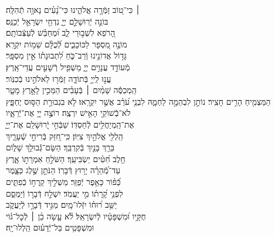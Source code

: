 \documentclass[twoside, openany, parskip=half, 11pt]{book}
\begin{document}
\begin{narrow}
 ׀ \hfill \break
כִּי־ט֭וֹב זַמְּֿרָ֣ה אֱלֹהֵ֑ינוּ \hfill כִּי־נָ֝עִ֗ים נָאוָ֥ה תְֿהִלָּֽה׃\\
בּוֹנֵ֣ה יְֿרֽוּשָׁלַ֣‍ִם יְיָ֑ \hfill נִדְחֵ֖י יִשְׂרָאֵ֣ל יְֿכַנֵּֽס׃\\
הָ֭רֹפֵא לִשְׁב֣וּרֵי לֵ֑ב \hfill וּ֝מְחַבֵּ֗שׁ לְֿעַצְּֿבוֹתָֽם׃\\
מוֹנֶ֣ה מִ֭סְפָּר לַכּוֹכָבִ֑ים \hfill לְֿ֝כֻלָּ֗ם שֵׁמ֥וֹת יִקְרָֽא׃\\
גָּד֣וֹל אֲדוֹנֵ֣ינוּ וְֿרַב־כֹּ֑חַ \hfill לִ֝תְבוּנָת֗וֹ אֵ֣ין מִסְפָּֽר׃ \\
מְֿעוֹדֵ֣ד עֲנָוִ֣ים יְיָ֑ \hfill מַשְׁפִּ֖יל רְֿשָׁעִ֣ים עֲדֵי־אָֽרֶץ׃\\
עֱנ֣וּ לַֽייָ֣ בְּֿתוֹדָ֑ה \hfill זַמְּֿר֖וּ לֵאלֹהֵ֣ינוּ בְֿכִנּֽוֹר׃\\
הַֽמְכַסֶּ֬ה שָׁמַ֨יִם ׀ בְּֿעָבִ֗ים \hfill הַמֵּכִ֣ין לָאָ֣רֶץ מָטָ֑ר\\ הַמַּצְמִ֖יחַ הָרִ֣ים חָצִֽיר׃ \hfill
נוֹתֵ֣ן לִבְהֵמָ֣ה לַחְמָ֑הּ לִבְנֵ֥י עֹ֝רֵ֗ב אֲשֶׁ֣ר יִקְרָֽאוּ׃ \hfill
לֹ֤א בִגְבוּרַ֣ת הַסּ֣וּס יֶחְפָּ֑ץ \\ לֹא־בְֿֿשׁוֹקֵ֖י הָאִ֣ישׁ יִרְצֶֽה׃ \hfill
רוֹצֶ֣ה יְיָ֭ אֶת־יְֿרֵאָ֑יו\\ אֶת־הַֽמְיַחֲלִ֥ים לְֿחַסְדּֽוֹ׃ \hfill
שַׁבְּֿחִ֣י יְֿ֭רוּשָׁלַ‍ִם אֶת־יְיָ֑\\ הַֽלְלִ֖י אֱלֹהַ֣יִךְ צִיּֽוֹן׃ \hfill
כִּֽי־חִ֭זַּק בְּֿרִיחֵ֣י שְֿׁעָרָ֑יִךְ\\ בֵּרַ֖ךְ בָּנַ֣יִךְ בְּֿקִרְבֵּֽךְ׃ \hfill
הַשָּׂם־גְּֿֿבוּלֵ֥ךְ שָׁל֑וֹם\\ חֵ֥לֶב חִ֝טִּ֗ים יַשְׂבִּיעֵֽךְ׃ \hfill
הַשֹּׁלֵ֣חַ אִמְרָת֣וֹ אָ֑רֶץ\\ עַד־מְֿ֝הֵרָ֗ה יָר֥וּץ דְּֿבָרֽוֹ׃ \hfill
הַנֹּתֵ֣ן שֶׁ֣לֶג כַּצָּ֑מֶר\\ כְּֿ֝פ֗וֹר כָּאֵ֥פֶר יְֿפַזֵּֽר׃ \hfill
מַשְׁלִ֣יךְ קַֽרְח֣וֹ כְֿפִתִּ֑ים\\ לִפְנֵ֥י קָ֝רָת֗וֹ מִ֣י יַעֲמֹֽד׃ \hfill
יִשְׁלַ֣ח דְּֿבָר֣וֹ וְֿיַמְסֵ֑ם\\ יַשֵּׁ֥ב ר֝וּח֗וֹ יִזְּֿלוּ־מָֽיִם׃ \hfill
מַגִּ֣יד דְּֿבָרָ֣ו לְֿיַעֲקֹ֑ב\\ חֻקָּ֥יו וּ֝מִשְׁפָּטָ֗יו לְֿיִשְׂרָאֵֽל׃ \hfill
לֹ֘א עָ֤שָׂה כֵ֨ן ׀ לְֿכׇל־גּ֗וֹי\\ וּמִשְׁפָּטִ֥ים בַּל־יְֿדָע֗וּם \hfill הַֽלְלוּ־יָֽהּ׃



\end{narrow}
\end{document}
